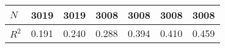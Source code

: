 \documentclass{article}
\begin{document}
\begin{table}[htbp]
\begin{tabular}{@{}|l|l|l|l|l|l|l|@{}}
$N$                                & 3019                                                        & 3019                                                        & 3008                                                        & 3008                                                        & 3008                                                        & 3008                                                        \\ \midrule
$R^2$                              & 0.191                                                       & 0.240                                                       & 0.288                                                       & 0.394                                                       & 0.410                                                       & 0.459                                                       \\ \bottomrule
\end{tabular}
\end{table}
\end{document}
